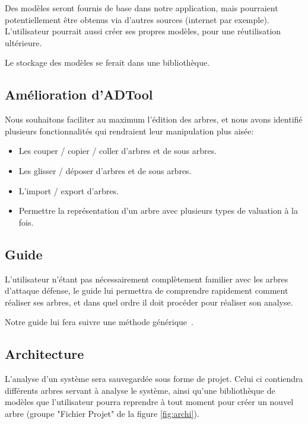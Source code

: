         Des modèles seront fournis de base dans notre application, mais pourraient potentiellement être obtenus via d'autres sources (internet par exemple). L'utilisateur pourrait aussi créer ses propres modèles, pour une réutilisation ultérieure.

        Le stockage des modèles se ferait dans une bibliothèque.

    \subsection{Amélioration d'ADTool}
        \label{sec:adtoolpp}

        Nous souhaitons faciliter au maximum l'édition des arbres, et nous avons identifié plusieurs fonctionnalités qui rendraient leur manipulation plus aisée:
        \begin{itemize}
            \item Les couper / copier / coller d'arbres et de sous arbres.
            \item Les glisser / déposer d'arbres et de sous arbres.
            \item L'import / export d'arbres.
            \item Permettre la représentation d'un arbre avec plusieurs types de valuation à la fois.
        \end{itemize}

    \subsection{Guide}
        \label{sec:guide}

        L'utilisateur n'étant pas nécessairement complètement familier avec les arbres d'attaque défense, le guide lui permettra de comprendre rapidement comment réaliser ses arbres, et dans quel ordre il doit procéder pour réaliser son analyse.

        Notre guide lui fera suivre une méthode générique~\cite{methode_analyse}.

    \subsection{Architecture}
        \label{sec:archi}

        L'analyse d'un système sera sauvegardée sous forme de projet. Celui ci contiendra différents arbres servant à analyse le système, ainsi qu'une bibliothèque de modèles que l'utilisateur pourra reprendre à tout moment pour créer un nouvel arbre (groupe "Fichier Projet" de la figure \ref{fig:archi}). 

